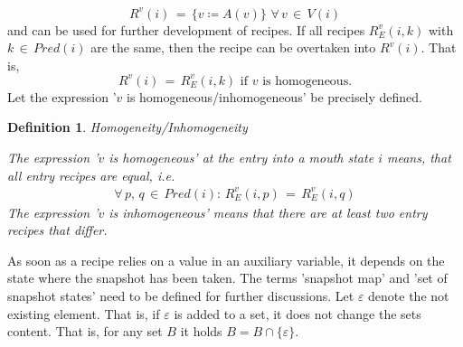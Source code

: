 \documentclass[12pt,a4paper]{scrartcl}
\newtheorem{definition}{Definition}
\begin{document}
\begin{equation}
    R^v(i) \,=\, \{ v \coloneqq A(v) \}\,\,\forall\,v\,\in\,V(i)
\end{equation}
and can be used for further development of recipes. If all recipes $R^v_E(i,k)$
with $k\,\in\,Pred(i)$ are the same, then the recipe can be overtaken into
$R^v(i)$. That is,
\begin{equation}
    R^v(i) \,=\, R^v_E(i,k)\,\,\mbox{if $v$ is homogeneous}.
\end{equation}
Let the expression '$v$ is homogeneous/inhomogeneous' be precisely defined.
\begin{definition} Homogeneity/Inhomogeneity

    The expression '$v$ is homogeneous' at the entry into a mouth state $i$
    means, that all entry recipes are equal, i.e.
    \begin{equation}
        \begin{aligned}
        \forall\,p,\,q\,\in\,Pred(i):\,R_E^v(i,p)\,=\,R_E^v(i,q) 
        \end{aligned}
    \end{equation}
    The expression '$v$ is inhomogeneous' means that there are at least two
    entry recipes that differ.
\end{definition}

As soon as a recipe relies on a value in an auxiliary variable, it depends on
the state where the snapshot has been taken. The terms 'snapshot map' and 'set
of snapshot states' need to be defined for further discussions. Let
$\varepsilon$ denote the not existing element. That is, if $\varepsilon$ is
added to a set, it does not change the sets content. That is, for any set $B$
it holds $B = B \cap \{ \varepsilon \}$.
\end{document}
